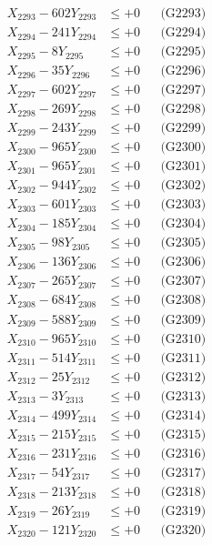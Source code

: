 \documentclass[a4paper,10pt]{article}
\begin{document}
{\begin{align}
X_{2293} - 602Y_{2293} &\leq +0 && \text{(G2293)} \\
X_{2294} - 241Y_{2294} &\leq +0 && \text{(G2294)} \\
X_{2295} - 8Y_{2295} &\leq +0 && \text{(G2295)} \\
X_{2296} - 35Y_{2296} &\leq +0 && \text{(G2296)} \\
X_{2297} - 602Y_{2297} &\leq +0 && \text{(G2297)} \\
X_{2298} - 269Y_{2298} &\leq +0 && \text{(G2298)} \\
X_{2299} - 243Y_{2299} &\leq +0 && \text{(G2299)} \\
X_{2300} - 965Y_{2300} &\leq +0 && \text{(G2300)} \\
\allowbreak
X_{2301} - 965Y_{2301} &\leq +0 && \text{(G2301)} \\
X_{2302} - 944Y_{2302} &\leq +0 && \text{(G2302)} \\
X_{2303} - 601Y_{2303} &\leq +0 && \text{(G2303)} \\
X_{2304} - 185Y_{2304} &\leq +0 && \text{(G2304)} \\
X_{2305} - 98Y_{2305} &\leq +0 && \text{(G2305)} \\
X_{2306} - 136Y_{2306} &\leq +0 && \text{(G2306)} \\
X_{2307} - 265Y_{2307} &\leq +0 && \text{(G2307)} \\
X_{2308} - 684Y_{2308} &\leq +0 && \text{(G2308)} \\
X_{2309} - 588Y_{2309} &\leq +0 && \text{(G2309)} \\
X_{2310} - 965Y_{2310} &\leq +0 && \text{(G2310)} \\
\allowbreak
X_{2311} - 514Y_{2311} &\leq +0 && \text{(G2311)} \\
X_{2312} - 25Y_{2312} &\leq +0 && \text{(G2312)} \\
X_{2313} - 3Y_{2313} &\leq +0 && \text{(G2313)} \\
X_{2314} - 499Y_{2314} &\leq +0 && \text{(G2314)} \\
X_{2315} - 215Y_{2315} &\leq +0 && \text{(G2315)} \\
X_{2316} - 231Y_{2316} &\leq +0 && \text{(G2316)} \\
X_{2317} - 54Y_{2317} &\leq +0 && \text{(G2317)} \\
X_{2318} - 213Y_{2318} &\leq +0 && \text{(G2318)} \\
X_{2319} - 26Y_{2319} &\leq +0 && \text{(G2319)} \\
X_{2320} - 121Y_{2320} &\leq +0 && \text{(G2320)} \\

\end{align}}
\end{document}
